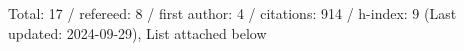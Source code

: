 Total: 17 / refereed: 8 / first author: 4 / citations: 914 / h-index: 9 (Last updated: 2024-09-29), List attached below